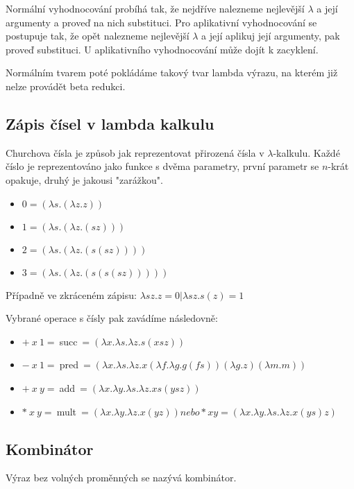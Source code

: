 \documentclass{szzclass}
\begin{document}
Normální vyhodnocování probíhá tak, že nejdříve nalezneme nejlevější $\lambda$ a její argumenty a proveď na nich substituci.
Pro aplikativní vyhodnocování se postupuje tak, že opět nalezneme nejlevější $\lambda$ a její aplikuj její argumenty, pak proveď substituci.
U aplikativního vyhodnocování může dojít k zacyklení.

Normálním tvarem poté pokládáme takový tvar lambda výrazu, na kterém již nelze provádět beta redukci.

\subsection{Zápis čísel v lambda kalkulu}

Churchova čísla je způsob jak reprezentovat přirozená čísla v $\lambda$-kalkulu. Každé číslo je reprezentováno jako funkce s dvěma parametry, první parametr se  $n$-krát opakuje, druhý je jakousi "zarážkou".

\begin{itemize}
    \item $0 = (\lambda s.(\lambda z.z))$
    \item $1 = (\lambda s.(\lambda z. (s z)))$
    \item $2 = (\lambda s.(\lambda z. (s (s z))))$
    \item $3 = (\lambda s.(\lambda z. (s (s (s z)))))$
\end{itemize}

Případně ve zkráceném zápisu: $\lambda sz.z = 0 | \lambda sz. s(z) = 1$

Vybrané operace s čísly pak zavádíme následovně:
\begin{itemize}
    \item $+~x~1 =~$succ$~= (\lambda x. \lambda s. \lambda z. s (x s z))$
    \item $-~x~1 =~$pred$~= (\lambda x. \lambda s. \lambda z. x (\lambda f. \lambda g.g (f s)) (\lambda g.z) (\lambda m.m))$
    \item $+~x~y =~$add$~= (\lambda x. \lambda y. \lambda s. \lambda z. x s (y s z))$
    \item $*~x~y =~$mult$~= (\lambda x. \lambda y. \lambda z. x (y z)) nebo * x y = (\lambda x. \lambda y. \lambda s. \lambda z. x (y s) z)$
\end{itemize}

\clearpage
\subsection{Kombinátor}
Výraz bez volných proměnných se nazývá kombinátor.
\end{document}
